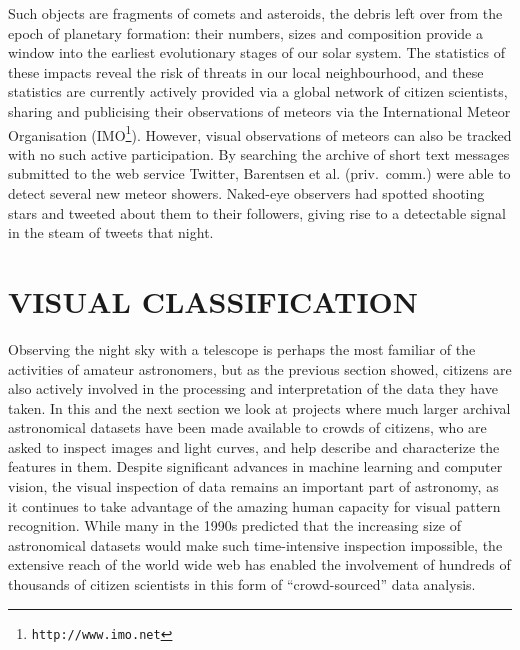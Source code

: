 \documentclass{ar2e}
\def\url#1{\texttt{#1}}
\begin{document}
Such objects are fragments of comets and asteroids, the debris left over from
the epoch of planetary formation: their numbers, sizes and composition provide a
window into the earliest evolutionary stages of our solar system.  The
statistics of these impacts reveal the risk of threats in our local
neighbourhood, and these statistics are currently actively provided via a global
network of citizen scientists, sharing and publicising their observations of
meteors via the International Meteor Organisation
(IMO\footnote{\url{http://www.imo.net}}). However, visual observations of
meteors can also be tracked with no such active participation. By searching the
archive of short text messages submitted to the web service Twitter, Barentsen
et al. (priv.\ comm.) were able to  detect several new meteor showers. Naked-eye
observers had spotted shooting stars and tweeted about them to their followers,
giving rise to a detectable signal in the steam of tweets that night. 




\section{VISUAL CLASSIFICATION}
\label{sec:class}

Observing the night sky with a telescope is perhaps the most familiar of the
activities of amateur astronomers, but as the previous section showed, citizens
are also actively involved in the processing and interpretation of the data they
have taken.  In this and the next section we look at projects where much larger
archival astronomical datasets have been made available to crowds of citizens,
who are asked to inspect images and light curves, and help describe and
characterize the features in them. Despite significant advances in machine
learning and computer vision, the visual inspection of data remains an important
part of astronomy, as it continues to take advantage of the amazing human
capacity for visual pattern recognition. While many in the 1990s predicted that
the increasing size of astronomical datasets would make such time-intensive
inspection impossible, the extensive reach of the world wide web has enabled the
involvement of hundreds of thousands of citizen scientists in this form of
``crowd-sourced'' data analysis. 

\end{document}
